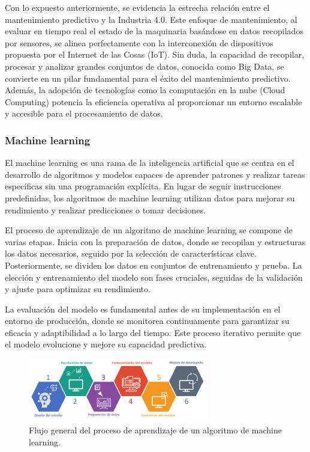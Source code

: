 \documentclass{article}[14pts]
\begin{document}
    Con lo expuesto anteriormente, se evidencia la estrecha relación entre el mantenimiento predictivo y la Industria 4.0. Este enfoque de mantenimiento, al evaluar en tiempo real el estado de la maquinaria basándose en datos recopilados por sensores, se alinea perfectamente con la interconexión de dispositivos propuesta por el Internet de las Cosas (IoT). Sin duda, la capacidad de recopilar, procesar y analizar grandes conjuntos de datos, conocida como Big Data, se convierte en un pilar fundamental para el éxito del mantenimiento predictivo. Además, la adopción de tecnologías como la computación en la nube (Cloud Computing) potencia la eficiencia operativa al proporcionar un entorno escalable y accesible para el procesamiento de datos.

    \subsubsection{Machine learning}

    El machine learning es una rama de la inteligencia artificial que se centra en el desarrollo de algoritmos y 
    modelos capaces de aprender patrones y realizar tareas específicas sin una programación explícita. En lugar de 
    seguir instrucciones predefinidas, los algoritmos de machine learning utilizan datos para mejorar su rendimiento y realizar predicciones o tomar decisiones. 

    El proceso de aprendizaje de un algoritmo de machine learning se compone de varias etapas. Inicia con la 
    preparación de datos, donde se recopilan y estructuras los datos necesarios, seguido por la selección de 
    características clave. Posteriormente, se dividen los datos en conjuntos de entrenamiento y prueba. La elección 
    y entrenamiento del modelo son fases cruciales, seguidas de la validación y ajuste para optimizar su rendimiento. 

    La evaluación del modelo es fundamental antes de su implementación en el entorno de producción, donde se 
    monitorea continuamente para garantizar su eficacia y adaptibilidad a lo largo del tiempo. Este proceso iterativo permite que el modelo evolucione y mejore su capacidad predictiva.

      \begin{center}
        \begin{figure}[h]
          \centering
          \includegraphics[width=0.7\textwidth]{images/workflowml.png}
          \caption{Flujo general del proceso de aprendizaje de un algoritmo de machine learning.}
        \end{figure}    
      \end{center}
\end{document}
